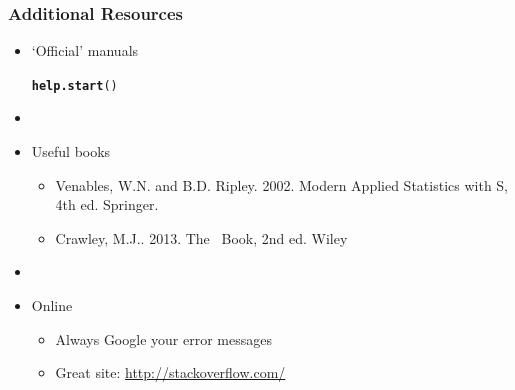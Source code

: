 \documentclass[color=usenames,dvipsnames]{beamer}\usepackage[]{graphicx}\usepackage[]{color}
\makeatletter
\newcommand{\hlstd}[1]{\textcolor[rgb]{0.345,0.345,0.345}{#1}}%
\newcommand{\hlkwd}[1]{\textcolor[rgb]{0.737,0.353,0.396}{\textbf{#1}}}%
\newenvironment{kframe}{%
 \def\at@end@of@kframe{}%
 \ifinner\ifhmode%
  \def\at@end@of@kframe{\end{minipage}}%
  \begin{minipage}{\columnwidth}%
 \fi\fi%
 \def\FrameCommand##1{\hskip\@totalleftmargin \hskip-\fboxsep
 \colorbox{shadecolor}{##1}\hskip-\fboxsep
     \hskip-\linewidth \hskip-\@totalleftmargin \hskip\columnwidth}%
 \MakeFramed {\advance\hsize-\width
   \@totalleftmargin\z@ \linewidth\hsize
   \@setminipage}}%
 {\par\unskip\endMakeFramed%
 \at@end@of@kframe}
\newenvironment{knitrout}{}{} %
\makeatother
\begin{document}
\begin{frame}[fragile]
  \frametitle{Additional Resources}
  \Large
\begin{itemize}
  \item `Official' manuals
\begin{knitrout}
\color{fgcolor}\begin{kframe}
\begin{alltt}
\hlkwd{help.start}\hlstd{()}
\end{alltt}
\end{kframe}
\end{knitrout}
  \item[]
  \item Useful books
    \begin{itemize}
      \large
      \item Venables, W.N. and B.D. Ripley. 2002. Modern Applied Statistics with
        S, 4th ed. Springer.
      \item Crawley, M.J.. 2013. The \R~Book, 2nd ed. Wiley
    \end{itemize}
  \item[]
  \item Online
    \begin{itemize}
      \large
      \item Always Google your error messages
      \item Great site: \url{http://stackoverflow.com/}
    \end{itemize}
\end{itemize}
\end{frame}
\end{document}
